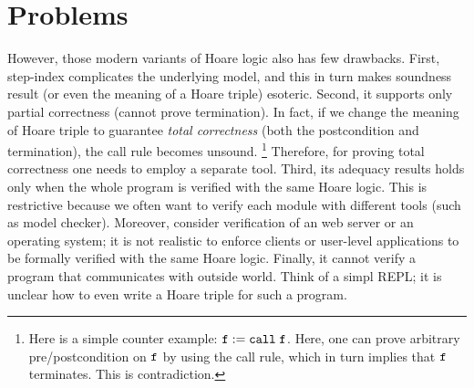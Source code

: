 \section{Problems}
\label{sec:program:problem}

However, those modern variants of Hoare logic also has few drawbacks.
First, step-index complicates the underlying model, and this in turn makes soundness result (or even the meaning of a Hoare triple) esoteric.
Second, it supports only partial correctness (\ie cannot prove termination).
In fact, if we change the meaning of Hoare triple to guarantee {\it total correctness} (\ie both the postcondition and termination), the call rule becomes unsound.
\footnote{Here is a simple counter example: $\texttt{f} := \texttt{call} \; \texttt{f}$. Here, one can prove arbitrary pre/postcondition on $\texttt{f}$ by using the call rule, which in turn implies that $\texttt{f}$ terminates. This is contradiction.}
Therefore, for proving total correctness one needs to employ a separate tool.
Third, its adequacy results holds only when the whole program is verified with the same Hoare logic.
This is restrictive because we often want to verify each module with different tools (such as model checker).
Moreover, consider verification of an web server or an operating system; it is not realistic to enforce clients or user-level applications to be formally verified with the same Hoare logic.
Finally, it cannot verify a program that communicates with outside world. Think of a simpl REPL; it is unclear how to even write a Hoare triple for such a program.
